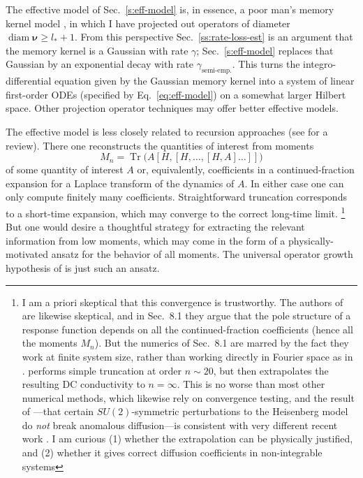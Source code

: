 \documentclass[aps,prb,nofootinbib,twocolumn,balancelastpage,amsmath,amssymb,floatfix,superscriptaddress,]{revtex4-1}
\newcommand{\tr}{\operatorname{Tr}}
\DeclareMathOperator{\diam}{diam}
\newcommand{\semiemp}{\text{semi-emp.}}
\begin{document}
  The effective model of Sec.~\ref{s:eff-model} is, in essence, a poor man's memory kernel model \cite{forster_hydrodynamic_1975,zwanzig_memory_1961,mori_transport_1965},
  in which I have projected out operators of diameter $\diam \bm \nu \ge l_* + 1$.
  From this perspective Sec.~\ref{ss:rate-loss-est} is an argument that
  the memory kernel is a Gaussian with rate $\gamma$;
  Sec.~\ref{s:eff-model} replaces that Gaussian by an exponential decay with rate $\gamma_{\semiemp}$.
  This turns the integro-differential equation given by the Gaussian memory kernel into a system of linear first-order ODEs
  (specified by Eq.~\eqref{eq:eff-model})
  on a somewhat larger Hilbert space.
  Other projection operator techniques \cite{grabert_projection_1982} may offer better effective models.

  The effective model is less closely related to recursion approaches
  (see  for a review).
  There one reconstructs the quantities of interest from moments
  \begin{equation}
    \label{eq:moment}
    M_n = \tr\Big(A [H,[H,\dots, [H,A]\dots]]\Big)
  \end{equation}
  of some quantity of interest $A$ or, equivalently, coefficients in a continued-fraction expansion for a Laplace transform of the dynamics of $A$.
  In either case one can only compute finitely many coefficients.
  Straightforward truncation corresponds to a short-time expansion,
  which may converge to the correct long-time limit.
  \footnote{
      I am a priori skeptical that this convergence is trustworthy.
      The authors of  are likewise skeptical,
      and in Sec.~8.1 they argue that the pole structure of a response function depends on all the continued-fraction coefficients (hence all the moments $M_n$).
      But the numerics of  Sec.~8.1 are marred by the fact they work at finite system size,
      rather than working directly in Fourier space as in .
       performs simple truncation at order $n \sim 20$,
      but then extrapolates the resulting DC conductivity to $n = \infty$.
      This is no worse than most other numerical methods, which likewise rely on convergence testing,
      and the result of ---that certain $SU(2)$-symmetric perturbations to the Heisenberg model do \textit{not} break anomalous diffusion---is consistent with very different recent work \cite{de_nardis_stability_2021}.
      I am curious (1) whether the extrapolation can be physically justified, and (2) whether it gives correct diffusion coefficients in non-integrable systems
  }
  But one would desire a thoughtful strategy for extracting the relevant information from low moments,
  which may come in the form of a physically-motivated ansatz for the behavior of all moments.
  The universal operator growth hypothesis of  is just such an ansatz.
\end{document}
